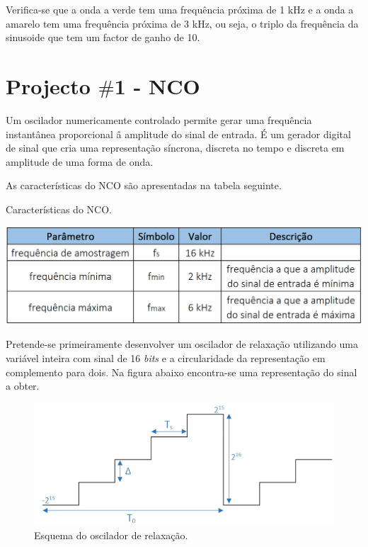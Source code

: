 \documentclass[11pt]{article}
\numberwithin{equation}{section}
\begin{document}
Verifica-se que a onda a verde tem uma frequência próxima de 1 kHz e a onda a amarelo tem uma frequência próxima de 3 kHz, ou seja, o triplo da frequência da sinusoide que tem um factor de ganho de 10.

\pagebreak

\section{Projecto $\#$1 - NCO}

Um oscilador numericamente controlado permite gerar uma frequência instantânea proporcional â amplitude do sinal de entrada. É um gerador digital de sinal que cria uma representação síncrona, discreta no tempo e discreta em amplitude de uma forma de onda.

As características do NCO são apresentadas na tabela seguinte.

\begin{table}[H]
	\centering
	\caption{Características do NCO.}
	\vspace{-1.5mm}
	\includegraphics[keepaspectratio=true, scale=0.45]{tabelas/tabela1}
\end{table}

Pretende-se primeiramente desenvolver um oscilador de relaxação utilizando uma variável inteira com sinal de 16 \textit{bits} e a circularidade da representação em complemento para dois. Na figura abaixo encontra-se uma representação do sinal a obter.

\begin{figure}[H]
	\centering
	\includegraphics[keepaspectratio=true, scale=0.37]{teoricas/rampa}
	\caption{Esquema do oscilador de relaxação.}
	\vspace{-0.8em}
\end{figure}
\end{document}
